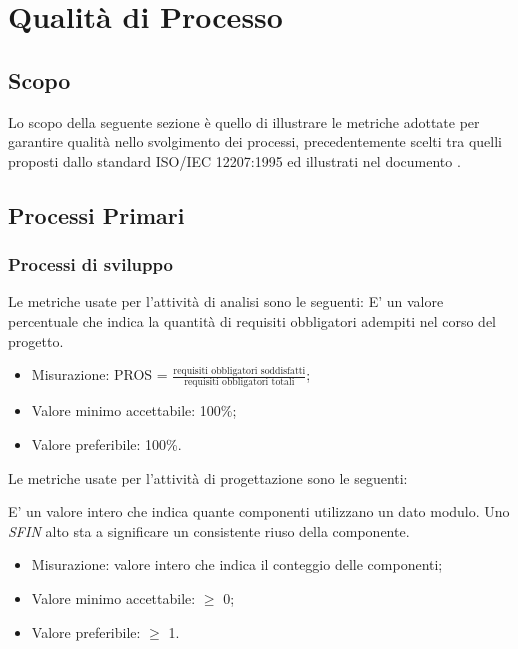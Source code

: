 \section{Qualità di Processo}

\subsection{Scopo}
Lo scopo della seguente sezione è quello di illustrare le metriche adottate per garantire qualità nello svolgimento dei processi, precedentemente scelti tra quelli proposti dallo standard ISO/IEC 12207:1995 ed illustrati nel documento \NdP.

\subsection{Processi Primari}

	\subsubsection{Processi di sviluppo}
	
		Le metriche usate per l'attività di analisi sono le seguenti:
			E' un valore percentuale che indica la quantità di requisiti obbligatori adempiti nel corso del progetto.
			 \begin{itemize}
			\item{Misurazione: PROS = $\displaystyle\frac{\mbox{requisiti obbligatori soddisfatti}}{\mbox{requisiti obbligatori totali}}$;}
			\item{Valore minimo accettabile: 100\%;}
			\item{Valore preferibile: 100\%.}
		\end{itemize}

		Le metriche usate per l'attività di progettazione sono le seguenti:
		
			E' un valore intero che indica quante componenti utilizzano un dato modulo. Uno \textit{SFIN} alto sta a significare un consistente riuso della componente.
		\begin{itemize}
			\item{Misurazione: valore intero che indica il conteggio delle componenti;}
			\item{Valore minimo accettabile: $\geq$ 0;}
			\item{Valore preferibile: $\geq$ 1.}
		\end{itemize}
	
